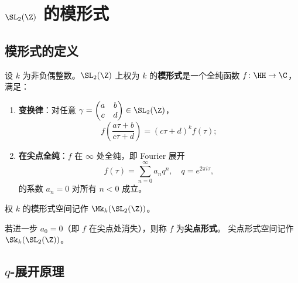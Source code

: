 \chapter{$\SL_2(\Z)$ 的模形式}
\label{ch:modular-forms-sl2z}

\section{模形式的定义}

\begin{definition}[模形式]
设 $k$ 为非负偶整数。$\SL_2(\Z)$ 上权为 $k$ 的\textbf{模形式}是一个全纯函数
$f\colon \HH \to \C$，满足：
\begin{enumerate}
  \item \textbf{变换律}：对任意
    $\gamma = \begin{pmatrix} a & b \\ c & d \end{pmatrix} \in \SL_2(\Z)$，
    \[
      f\!\left(\frac{a\tau + b}{c\tau + d}\right) = (c\tau + d)^k f(\tau);
    \]
  \item \textbf{在尖点全纯}：$f$ 在 $\infty$ 处全纯，即 Fourier 展开
    \[
      f(\tau) = \sum_{n=0}^{\infty} a_n q^n, \quad q = e^{2\pi i \tau},
    \]
    的系数 $a_n = 0$ 对所有 $n < 0$ 成立。
\end{enumerate}
权 $k$ 的模形式空间记作 $\Mk_k(\SL_2(\Z))$。
\end{definition}

\begin{definition}[尖点形式]
若进一步 $a_0 = 0$（即 $f$ 在尖点处消失），则称 $f$ 为\textbf{尖点形式}。
尖点形式空间记作 $\Sk_k(\SL_2(\Z))$。
\end{definition}

\section{$q$-展开原理}


